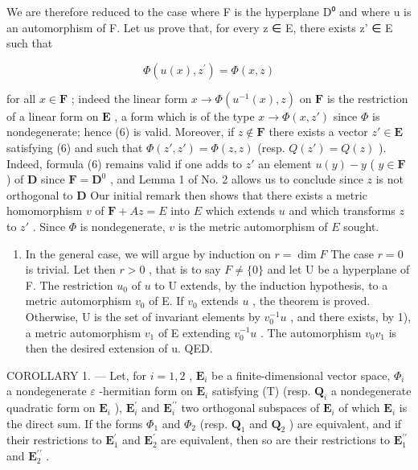 We are therefore reduced to the case where F is the hyperplane D⁰ and where u is an automorphism of F. Let us prove that, for every z ∈ E, there exists z' ∈ E such that

\[
\Phi (u (x), z ^ {\prime}) = \Phi (x, z)\tag{6}
\]

for all \(x \in \mathbf{F}\) ; indeed the linear form \(x \to \Phi(u^{-1}(x), z)\) on \(\mathbf{F}\) is the restriction of a linear form on \(\mathbf{E}\) , a form which is of the type \(x \to \Phi(x, z')\) since \(\Phi\) is nondegenerate; hence (6) is valid. Moreover, if \(z \notin \mathbf{F}\) there exists a vector \(z' \in \mathbf{E}\) satisfying (6) and such that \(\Phi(z', z') = \Phi(z, z)\) (resp. \(Q(z') = Q(z)\) ). Indeed, formula (6) remains valid if one adds to \(z'\) an element \(u(y) - y\) ( \(y \in \mathbf{F}\) ) of \(\mathbf{D}\) since \(\mathbf{F} = \mathbf{D}^0\) , and Lemma 1 of No. 2 allows us to conclude since \(z\) is not orthogonal to \(\mathbf{D}\) Our initial remark then shows that there exists a metric homomorphism \(v\) of \(\mathbf{F} + A z = E\) into \(E\) which extends \(u\) and which transforms \(z\) to \(z'\) . Since \(\Phi\) is nondegenerate, \(v\) is the metric automorphism of \(E\) sought.

\begin{enumerate}
\def\labelenumi{\arabic{enumi})}
\setcounter{enumi}{1}
\tightlist
\item
  In the general case, we will argue by induction on \(r = \dim F\) The case \(r = 0\) is trivial. Let then \(r > 0\) , that is to say \(F \neq \{0\}\) and let U be a hyperplane of F. The restriction \(u_0\) of \(u\) to U extends, by the induction hypothesis, to a metric automorphism \(v_0\) of E. If \(v_0\) extends \(u\) , the theorem is proved. Otherwise, U is the set of invariant elements by \(v_{0}^{-1}u\) , and there exists, by 1), a metric automorphism \(v_{1}\) of E extending \(v_{0}^{-1}u\) . The automorphism \(v_{0}v_{1}\) is then the desired extension of u. QED.
\end{enumerate}

COROLLARY 1. --- Let, for \(i=1,2\) , \(\mathbf{E}_{i}\) be a finite-dimensional vector space, \(\Phi_{i}\) a nondegenerate \(\varepsilon\) -hermitian form on \(\mathbf{E}_{i}\) satisfying (T) (resp. \(\mathbf{Q}_{i}\) a nondegenerate quadratic form on \(\mathbf{E}_{i}\) ), \(\mathbf{E}_{i}^{\prime}\) and \(\mathbf{E}_{i}^{\prime\prime}\) two orthogonal subspaces of \(\mathbf{E}_{i}\) of which \(\mathbf{E}_{i}\) is the direct sum. If the forms \(\Phi_{1}\) and \(\Phi_{2}\) (resp. \(\mathbf{Q}_{1}\) and \(\mathbf{Q}_{2}\) ) are equivalent, and if their restrictions to \(\mathbf{E}_{1}^{\prime}\) and \(\mathbf{E}_{2}^{\prime}\) are equivalent, then so are their restrictions to \(\mathbf{E}_{1}^{\prime\prime}\) and \(\mathbf{E}_{2}^{\prime\prime}\) .

